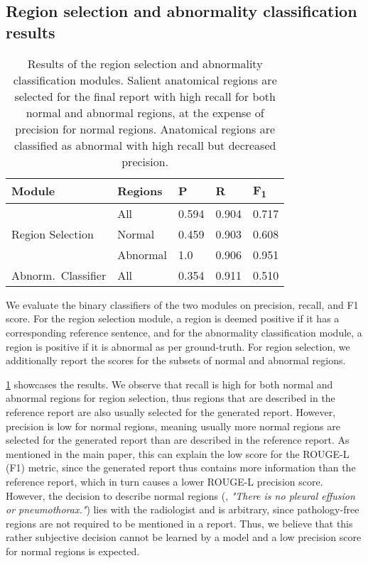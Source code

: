 \documentclass[10pt,twocolumn,letterpaper]{article}
\begin{document}
\subsection{Region selection and abnormality classification results}\label{region_selection_abnormality_classifier_results}
\begin{table}[t!]
\centering
\setlength{\tabcolsep}{0.5em}
\begin{tabular}{lllll}
\hline
Module & Regions    & P     & R     & F\textsubscript{1}    \\ \hline
\multirow{3}{*}{Region Selection} &
All       & 0.594 & 0.904 & 0.717 \\
& Normal    & 0.459 & 0.903 & 0.608 \\
& Abnormal  & 1.0   & 0.906 & 0.951 \\ \hline
Abnorm.\ Classifier& All  & 0.354 &  0.911 & 0.510 \\ \hline
\end{tabular}
\caption{Results of the region selection and abnormality classification modules. Salient anatomical regions are selected for the final report with high recall for both normal and abnormal regions, at the expense of precision for normal regions. Anatomical regions are classified as abnormal with high recall but decreased precision.}
\label{tab:region-selection-abnormality-classifier-results}
\end{table}

We evaluate the binary classifiers of the two modules on precision, recall, and F1 score. For the region selection module, a region is deemed positive if it has a corresponding reference sentence, and for the abnormality classification module, a region is positive if it is abnormal as per ground-truth. For region selection, we additionally report the scores for the subsets of normal and abnormal regions.

\cref{tab:region-selection-abnormality-classifier-results} showcases the results. We observe that recall is high for both normal and abnormal regions for region selection, thus regions that are described in the reference report are also usually selected for the generated report. However, precision is low for normal regions, meaning usually more normal regions are selected for the generated report than are described in the reference report. As mentioned in the main paper, this can explain the low score for the ROUGE-L (F1) metric, since the generated report thus contains more information than the reference report, which in turn causes a lower ROUGE-L precision score. However, the decision to describe normal regions (\eg, \emph{"There is no pleural effusion or pneumothorax."}) lies with the radiologist and is arbitrary, since pathology-free regions are not required to be mentioned in a report. Thus, we believe that this rather subjective decision cannot be learned by a model and a low precision score for normal regions is expected.
\end{document}
